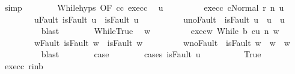 \begin{isabellebody}
\ simp\isanewline
\ \ \ \ \ \ \isamarkupfalse%
\ While{\isachardot}hyps\ {\isacharbrackleft}OF\ c{\isacharprime}{\isacharprime}{\isacharunderscore}c{\isacharprime}\ exec{\isacharunderscore}c{\isacharprime}{\isacharprime}{\isacharbrackright}\ \isamarkupfalse%
\ u{\isacharprime}\ \isanewline
\ \ \ \ \ \ \ \ exec{\isacharunderscore}c{\isacharprime}{\isacharcolon}\ {\isachardoublequoteopen}{\isasymGamma}{\isasymturnstile}{\isasymlangle}c{\isacharprime}{\isacharcomma}Normal\ r{\isasymrangle}\ {\isacharequal}n{\isasymRightarrow}\ u{\isacharprime}{\isachardoublequoteclose}\ \isanewline
\ \ \ \ \ \ \ \ u{\isacharunderscore}Fault{\isacharcolon}\ {\isachardoublequoteopen}isFault\ u\ {\isasymlongrightarrow}\ isFault\ u{\isacharprime}\ {\isachardoublequoteclose}\ \isanewline
\ \ \ \ \ \ \ \ u{\isacharprime}{\isacharunderscore}noFault{\isacharcolon}\ {\isachardoublequoteopen}{\isasymnot}\ isFault\ u{\isacharprime}\ {\isasymlongrightarrow}\ u{\isacharprime}\ {\isacharequal}\ u{\isachardoublequoteclose}\isanewline
\ \ \ \ \ \ \ \ \isamarkupfalse%
\ blast\isanewline
\ \ \ \ \ \ \isamarkupfalse%
\ WhileTrue\ \isamarkupfalse%
\ w{\isacharprime}\ \isanewline
\ \ \ \ \ \ \ \ exec{\isacharunderscore}w{\isacharcolon}\ {\isachardoublequoteopen}{\isasymGamma}{\isasymturnstile}{\isasymlangle}While\ b\ c{\isacharprime}{\isacharcomma}u{\isasymrangle}\ {\isacharequal}n{\isasymRightarrow}\ w{\isacharprime}{\isachardoublequoteclose}\ \isanewline
\ \ \ \ \ \ \ \ w{\isacharunderscore}Fault{\isacharcolon}\ {\isachardoublequoteopen}isFault\ w\ {\isasymlongrightarrow}\ isFault\ w{\isacharprime}{\isachardoublequoteclose}\ \isanewline
\ \ \ \ \ \ \ \ w{\isacharprime}{\isacharunderscore}noFault{\isacharcolon}\ {\isachardoublequoteopen}{\isasymnot}\ isFault\ w{\isacharprime}\ {\isasymlongrightarrow}\ w{\isacharprime}\ {\isacharequal}\ w{\isachardoublequoteclose}\isanewline
\ \ \ \ \ \ \ \ \isamarkupfalse%
\ blast\isanewline
\ \ \ \ \ \ \isamarkupfalse%
\ {\isacharquery}case\isanewline
\ \ \ \ \ \ \isamarkupfalse%
\ {\isacharparenleft}cases\ {\isachardoublequoteopen}isFault\ u{\isacharprime}{\isachardoublequoteclose}{\isacharparenright}\isanewline
\ \ \ \ \ \ \ \ \isamarkupfalse%
\ True\isanewline
\ \ \ \ \ \ \ \ \isamarkupfalse%
\ exec{\isacharunderscore}c{\isacharprime}\ r{\isacharunderscore}in{\isacharunderscore}b\isanewline

\end{isabellebody}
